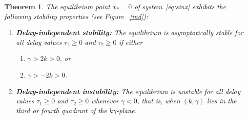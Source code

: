 \documentclass[11pt]{article}
\newtheorem{theorem}{Theorem}[section]
\theoremstyle{remark}
\begin{document}
\begin{theorem}
	\label{prel}
	The equilibrium point $x_* = 0$ of system~\eqref{eq:sinx} exhibits the following stability properties (see Figure ~\ref{ind}):
	\begin{enumerate}[label=(\alph*)]
		\item \textbf{Delay-independent stability:}
		The equilibrium is asymptotically stable for all delay values
		$\tau_1 \ge 0$ and $\tau_2 \ge 0$ if either
		\begin{enumerate}[label=(\roman*)]
			\item $\gamma > 2k > 0$, or
			\item $\gamma > -2k > 0$.
		\end{enumerate}
		
		\item \textbf{Delay-independent instability:}
		The equilibrium is unstable for all delay values
		$\tau_1 \ge 0$ and $\tau_2 \ge 0$ whenever $\gamma < 0$, that is, when
		$(k,\gamma)$ lies in the third or fourth quadrant of the $k\gamma$-plane.
	\end{enumerate}
\end{theorem}
\end{document}

